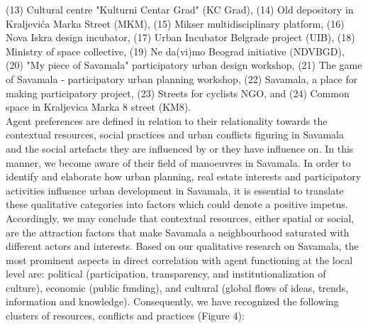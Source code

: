 \documentclass[11pt]{report}
\begin{document}
(13) Cultural centre "Kulturni Centar Grad" (KC Grad),
(14) Old depository in Kraljevića Marka Street (MKM),
(15) Mikser multidisciplinary platform,
(16) Nova Iskra design incubator,
(17) Urban Incubator Belgrade project (UIB),
(18) Ministry of space collective,
(19) Ne da(vi)mo Beograd initiative (NDVBGD),
(20) "My piece of Savamala" participatory urban design workshop,
(21) The game of Savamala - participatory urban planning workshop,
(22) Savamala, a place for making participatory project,
(23) Streets for cyclists NGO,
and (24) Common space in Kraljevica Marka 8 street (KM8).
\\
Agent preferences are defined in relation to their relationality towards the contextual resources, social practices and urban conflicts figuring in Savamala and the social artefacts they are influenced by or they have influence on. In this manner, we become aware of their field of manoeuvres in Savamala. In order to identify and elaborate how urban planning, real estate interests and participatory activities influence urban development in Savamala, it is essential to translate these qualitative categories into factors which could denote a positive impetus.
\\
Accordingly, we may conclude that contextual resources, either spatial or social, are the attraction factors that make Savamala a neighbourhood saturated with different actors and interests.
Based on our qualitative research on Savamala, the most prominent aspects in direct correlation with agent functioning at the local level are: political (participation, transparency, and institutionalization of culture), economic (public funding), and cultural (global flows of ideas, trends, information and knowledge). Consequently, we have recognized the following clusters of resources, conflicts and practices (Figure 4):
\end{document}
